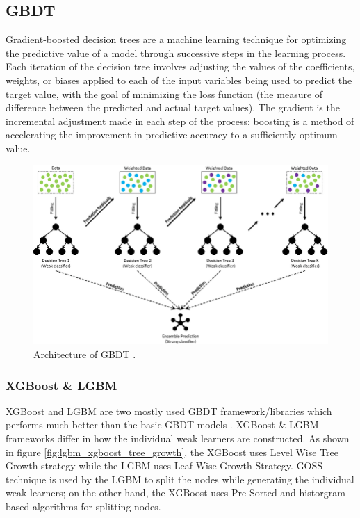 \documentclass[twoside,11pt,a4paper]{article}
\begin{document}
\subsection{\acf{GBDT}}
Gradient-boosted decision trees are a machine learning technique for optimizing the predictive value of a model through successive steps in the learning process. Each iteration of the decision tree involves adjusting the values of the coefficients, weights, or biases applied to each of the input variables being used to predict the target value, with the goal of minimizing the loss function (the measure of difference between the predicted and actual target values). The gradient is the incremental adjustment made in each step of the process; boosting is a method of accelerating the improvement in predictive accuracy to a sufficiently optimum value.\\
\begin{figure}[ht]
	\centering
	\includegraphics[width=1\textwidth]{gbdt}
	\caption[Architecture of \acf{GBDT}]{Architecture of \acf{GBDT} \cite{deng2021ensemble}.}
	\label{fig:gbdt}
\end{figure}
\FloatBarrier
\subsubsection{\acf{XGBoost} \& \acf{LGBM}} \label{sec:xgboost_lgbm}
\acf{XGBoost}\citep{chen2016xgboost} and \acf{LGBM}\citep{ke2017lightgbm} are two mostly used \acf{GBDT} framework/libraries which performs much better than the basic \acs{GBDT} models \citep{machado2019lightgbm}. \acf{XGBoost} \& \acs{LGBM} frameworks differ in how the individual weak learners are constructed. As shown in figure \ref{fig:lgbm_xgboost_tree_growth}, the \acs{XGBoost} uses Level Wise Tree Growth strategy while the \acs{LGBM} uses Leaf Wise Growth Strategy. \acf{GOSS} technique is used by the \acs{LGBM} to split the nodes while generating the individual weak learners; on the other hand, the \acs{XGBoost} uses Pre-Sorted and historgram based algorithms for splitting nodes.\\
\end{document}

